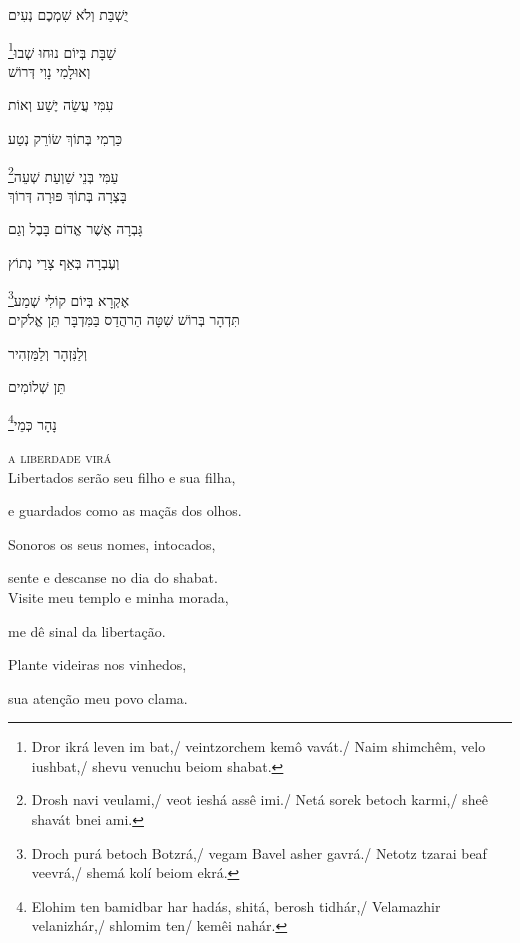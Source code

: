 יֻשְׁבַּת וְלֹא שִׁמְכֶם נְעִים

\footnote{Dror ikrá leven im bat,/ veintzorchem kemô vavát./ Naim shimchêm, velo iushbat,/ shevu venuchu beiom shabat.}שַׁבָּת בְּיוֹם נוּחוּ שְׁבוּ\\[10pt]


וְאוּלָמִי נָוִי דְּרוֹשׁ

עִמִּי עֲשֵׂה יֶשַׁע וְאוֹת

כַּרְמִי בְּתוֹךְ שׂוֹרֵק נְטַע

\footnote{Drosh navi veulami,/ veot ieshá assê imi./ Netá sorek betoch karmi,/ sheê shavát bnei ami.}עַמִּי בְּנֵי שַׁוְעַת שְׁעֵה\\[10pt]



בָּצְרָה בְּתוֹךְ פּוּרָה דְּרוֹךְ

גָּבְרָה אֲשֶׁר אֱדוֹם בָּבֶל וְגַם

וְעֶבְרָה בְּאַף צָרַי נְתוֹץ

\footnote{Droch purá betoch Botzrá,/ vegam Bavel asher gavrá./ Netotz tzarai beaf veevrá,/ shemá kolí beiom ekrá.}אֶקְרָא בְּיוֹם קוֹלִי שְׁמַע\\[10pt]


תִּדְהָר בְּרוֹשׁ שִׁטָּה הַרהֲדַס בַּמִּדְבָּר תֵּן אֱלֹקים

וְלַנִּזְהָר וְלַמַּזְהִיר

תֵּן שְׁלוֹמִים

\footnote{Elohim ten bamidbar har hadás, shitá, berosh tidhár,/ Velamazhir velanizhár,/ shlomim ten/ kemêi nahár.}נָהָר כְּמֵי\\[10pt]


\movetooddpage
\raggedright

\vspace*{1cm}

\textsc{a liberdade virá}\\[15pt]


Libertados serão seu filho e sua filha,

e guardados como as maçãs dos olhos.

Sonoros os seus nomes, intocados,

sente e descanse no dia do shabat.\\[10pt]


Visite meu templo e minha morada,

me dê sinal da libertação.

Plante videiras nos vinhedos,

sua atenção meu povo clama.\\[10pt]


